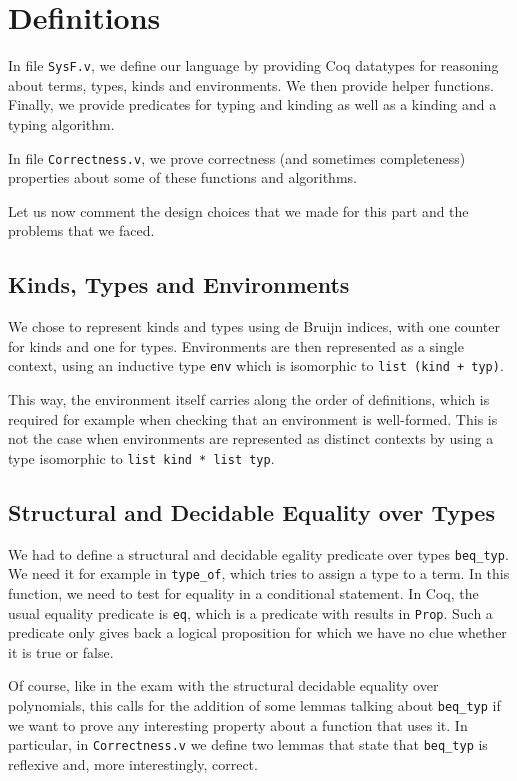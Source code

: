 \documentclass[a4paper,11pt]{article}
\begin{document}
\section{Definitions}

In file \verb|SysF.v|, we define our language by providing Coq
datatypes for reasoning about terms, types, kinds and environments. We
then provide helper functions. Finally, we provide predicates for
typing and kinding as well as a kinding and a typing algorithm.

In file \verb|Correctness.v|, we prove correctness (and sometimes
completeness) properties about some of these functions and algorithms.

Let us now comment the design choices that we made for this part and
the problems that we faced.

\subsection*{Kinds, Types and Environments}

We chose to represent kinds and types using de Bruijn indices, with
one counter for kinds and one for types. Environments are then
represented as a single context, using an inductive type \verb|env|
which is isomorphic to \verb|list (kind + typ)|.

This way, the environment itself carries along the order of
definitions, which is required for example when checking that an
environment is well-formed. This is not the case when environments are
represented as distinct contexts by using a type isomorphic to
\verb|list kind * list typ|.

\subsection*{Structural and Decidable Equality over Types}

We had to define a structural and decidable egality predicate over
types \verb|beq_typ|. We need it for example in \verb|type_of|, which
tries to assign a type to a term. In this function, we need to test
for equality in a conditional statement. In Coq, the usual equality
predicate is \verb|eq|, which is a predicate with results in
\verb|Prop|. Such a predicate only gives back a logical proposition
for which we have no clue whether it is true or false.

Of course, like in the exam with the structural decidable equality over
polynomials, this calls for the addition of some lemmas talking about
\verb|beq_typ| if we want to prove any interesting property about a
function that uses it. In particular, in \verb|Correctness.v| we
define two lemmas that state that \verb|beq_typ| is reflexive and,
more interestingly, correct.
\end{document}

